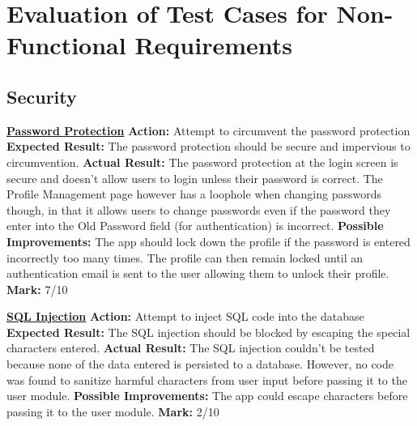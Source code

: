 \documentclass[english]{article}
\begin{document}
	\section{Evaluation of Test Cases for Non-Functional Requirements}
	
\subsection{Security}\label{subsec:overall-security}
		    \textbf{\underline{Password Protection}}\newline
		    \textbf{Action:} Attempt to circumvent the password protection\newline
            \textbf{Expected Result:} The password protection should be secure and impervious to circumvention.\newline
            \textbf{Actual Result:} The password protection at the login screen is secure and doesn't allow users to login unless their password is correct. The Profile Management page however has a loophole when changing passwords though, in that it allows users to change passwords even if the password they enter into the Old Password field (for authentication) is incorrect.\newline
            \textbf{Possible Improvements:} The app should lock down the profile if the password is entered incorrectly too many times. The profile can then remain locked until an authentication email is sent to the user allowing them to unlock their profile. \newline
            \textbf{Mark:} 7/10\newline
            
            \textbf{\underline{SQL Injection}}\newline
		    \textbf{Action:} Attempt to inject SQL code into the database\newline
            \textbf{Expected Result:} The SQL injection should be blocked by escaping the special characters entered.\newline
            \textbf{Actual Result:} The SQL injection couldn't be tested because none of the data entered is persisted to a database. However, no code was found to sanitize harmful characters from user input before passing it to the user module. \newline
            \textbf{Possible Improvements:} The app could escape characters before passing it to the user module. \newline
            \textbf{Mark:} 2/10\newline
\end{document}
